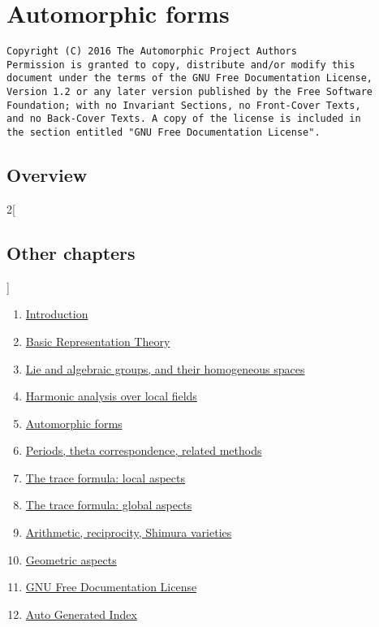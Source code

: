 \documentclass{stacks-project-book}
\theoremstyle{plain}
\theoremstyle{definition}
\theoremstyle{remark}
\numberwithin{equation}{subsection}
\begin{document}
%

\chapter{Automorphic forms}



\label{automorphicforms-section-phantom}

\begin{verbatim}
Copyright (C) 2016 The Automorphic Project Authors
Permission is granted to copy, distribute and/or modify this
document under the terms of the GNU Free Documentation License,
Version 1.2 or any later version published by the Free Software
Foundation; with no Invariant Sections, no Front-Cover Texts,
and no Back-Cover Texts. A copy of the license is included in
the section entitled "GNU Free Documentation License".
\end{verbatim}



\section{Overview}
\label{automorphicforms-section-overview}






\begin{multicols}{2}[\section{Other chapters}]
\noindent
\begin{enumerate}
\item \hyperref[introduction-section-phantom]{Introduction}
\item \hyperref[representationtheory-section-phantom]{Basic Representation Theory}
\item \hyperref[algebraicgroups-section-phantom]{Lie and algebraic groups, and their homogeneous spaces}
\item \hyperref[harmonicanalysis-section-phantom]{Harmonic analysis over local fields}
\item \hyperref[automorphicforms-section-phantom]{Automorphic forms}
\item \hyperref[periods-section-phantom]{Periods, theta correspondence, related methods}
\item \hyperref[traceformulalocal-section-phantom]{The trace formula: local aspects}
\item \hyperref[traceformulaglobal-section-phantom]{The trace formula: global aspects}
\item \hyperref[arithmetic-section-phantom]{Arithmetic, reciprocity, Shimura varieties}
\item \hyperref[geometric-section-phantom]{Geometric aspects}
\item \hyperref[fdl-section-phantom]{GNU Free Documentation License}
\item \hyperref[index-section-phantom]{Auto Generated Index}
\end{enumerate}
\end{multicols}
\end{document}

